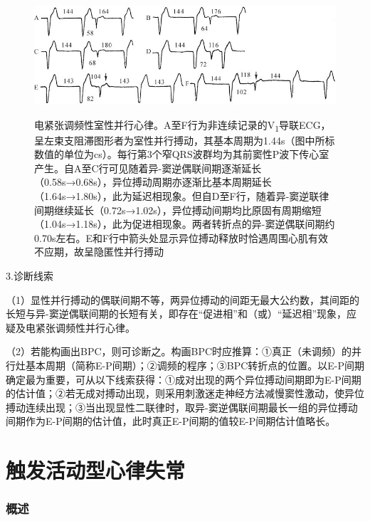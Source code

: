 \begin{figure}[!htbp]
 \centering
 \includegraphics[width=5.3125in,height=1.73958in]{./images/Image00299.jpg}
 \captionsetup{justification=centering}
 \caption{电紧张调频性室性并行心律。A至F行为非连续记录的V\textsubscript{1}导联ECG，呈左束支阻滞图形者为室性并行搏动，其基本周期为1.44s（图中所标数值的单位为cs）。每行第3个窄QRS波群均为其前窦性P波下传心室产生。自A至C行可见随着异-窦逆偶联间期逐渐延长（0.58s→0.68s），异位搏动周期亦逐渐比基本周期延长（1.64s→1.80s），此为延迟相现象。但自D至F行，随着异-窦逆联律间期继续延长（0.72s→1.02s），异位搏动间期均比原固有周期缩短（1.04s→1.18s），此为促进相现象。两者转折点的异-窦逆偶联间期约0.70s左右。E和F行中箭头处显示异位搏动释放时恰遇周围心肌有效不应期，故呈隐匿性并行搏动}
 \label{fig16-23}
  \end{figure} 


3.诊断线索

（1）显性并行搏动的偶联间期不等，两异位搏动的间距无最大公约数，其间距的长短与异-窦逆偶联间期的长短有关，即存在“促进相”和（或）“延迟相”现象，应疑及电紧张调频性并行心律。

（2）若能构画出BPC，则可诊断之。构画BPC时应推算：①真正（未调频）的并行灶基本周期（简称E-P间期）；②调频的程序；③BPC转折点的位置。以E-P间期确定最为重要，可从以下线索获得：①成对出现的两个异位搏动间期即为E-P间期的估计值；②若无成对搏动出现，则采用刺激迷走神经方法减慢窦性激动，使异位搏动连续出现；③当出现显性二联律时，取异-窦逆偶联间期最长一组的异位搏动间期作为E-P间期的估计值，此时真正E-P间期的值较E-P间期估计值略长。

\protect\hypertarget{text00024.html}{}{}

\protect\hypertarget{text00024.htmlux5cux23chapter24}{}{}

\chapter{触发活动型心律失常}

\protect\hypertarget{text00024.htmlux5cux23subid302}{}{}

\subsection{概述}

